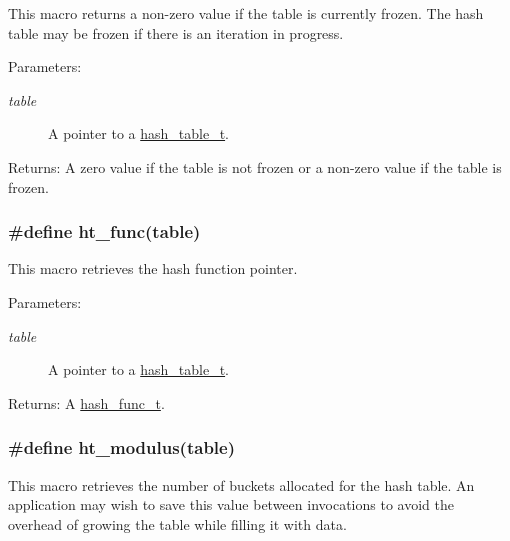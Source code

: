 This macro returns a non-zero value if the table is currently frozen. The hash table may be frozen if there is an iteration in progress.

\begin{Desc}
\item[Parameters:]
\begin{description}
\item[{\em table}]A pointer to a \hyperlink{group__dbprim__hash_a0}{hash\_\-table\_\-t}.\end{description}
\end{Desc}
\begin{Desc}
\item[Returns:]A zero value if the table is not frozen or a non-zero value if the table is frozen. \end{Desc}
\hypertarget{group__dbprim__hash_a24}{
\subsubsection[ht\_\-func]{\setlength{\rightskip}{0pt plus 5cm}\#define ht\_\-func(table)}}
\label{group__dbprim__hash_a24}


This macro retrieves the hash function pointer.

\begin{Desc}
\item[Parameters:]
\begin{description}
\item[{\em table}]A pointer to a \hyperlink{group__dbprim__hash_a0}{hash\_\-table\_\-t}.\end{description}
\end{Desc}
\begin{Desc}
\item[Returns:]A \hyperlink{group__dbprim__hash_a3}{hash\_\-func\_\-t}. \end{Desc}
\hypertarget{group__dbprim__hash_a22}{
\subsubsection[ht\_\-modulus]{\setlength{\rightskip}{0pt plus 5cm}\#define ht\_\-modulus(table)}}
\label{group__dbprim__hash_a22}


This macro retrieves the number of buckets allocated for the hash table. An application may wish to save this value between invocations to avoid the overhead of growing the table while filling it with data.

